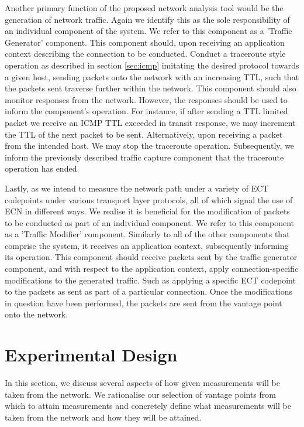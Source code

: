 \documentclass{l4proj}
\begin{document}
Another primary function of the proposed network analysis tool would be the generation of network traffic. Again we identify this as the sole responsibility of an individual component of the system. We refer to this component as a 'Traffic Generator' component. This component should, upon receiving an application context describing the connection to be conducted. Conduct a traceroute style operation as described in section \ref{sec:icmp} imitating the desired protocol towards a given host, sending packets onto the network with an increasing TTL, such that the packets sent traverse further within the network. This component should also monitor responses from the network. However, the responses should be used to inform the component's operation. For instance, if after sending a TTL limited packet we receive an ICMP TTL exceeded in transit response, we may increment the TTL of the next packet to be sent. Alternatively, upon receiving a packet from the intended host. We may stop the traceroute operation. Subsequently, we inform the previously described traffic capture component that the traceroute operation has ended.

Lastly, as we intend to measure the network path under a variety of ECT codepoints under various transport layer protocols, all of which signal the use of ECN in different ways. We realise it is beneficial for the modification of packets to be conducted as part of an individual component. We refer to this component as a 'Traffic Modifier' component. Similarly to all of the other components that comprise the system, it receives an application context, subsequently informing its operation. This component should receive packets sent by the traffic generator component, and with respect to the application context, apply connection-specific modifications to the generated traffic. Such as applying a specific ECT codepoint to the packets as sent as part of a particular connection. Once the modifications in question have been performed, the packets are sent from the vantage point onto the network.

\section{Experimental Design}
\label{sec:method}

In this section, we discuss several aspects of how given measurements will be taken from the network. We rationalise our selection of vantage points from which to attain measurements and concretely define what measurements will be taken from the network and how they will be attained.
\end{document}
